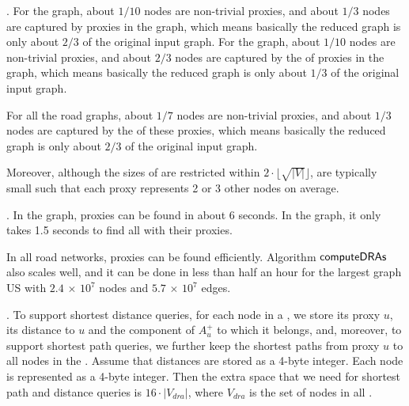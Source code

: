.
For the \dblp graph, about $1/10$ nodes are non-trivial proxies, and about $1/3$ nodes are captured by proxies in the graph, which means basically the reduced graph is only about $2/3$ of the original input graph. For the \dblpone graph, about $1/10$ nodes are non-trivial proxies, and about $2/3$ nodes are captured by the \dras of proxies in the graph, which means basically the reduced graph is only about $1/3$ of the original input graph.

For all the road graphs,  about $1/7$ nodes are non-trivial proxies, and about $1/3$ nodes are captured by the \dras of these proxies, which means basically the reduced graph is only about $2/3$ of the original input graph.

 Moreover, although the sizes of \dras are restricted within $2\cdot\lfloor\sqrt{|V|}\rfloor$, \dras are typically small such that each proxy represents 2 or 3 other nodes on average.







.
In the \dblp graph, proxies can be found in about 6 seconds. In the \dblpone graph, it only takes 1.5 seconds to find all \dras with their proxies.

In all road networks, proxies can be found efficiently. Algorithm ${\mathsf{computeDRAs}}$ also scales well, and it can be done in less than half an hour for the largest graph US with $2.4$ $\times$ $10^7$ nodes and $5.7$ $\times$ $10^7$ edges.

.
To support shortest distance queries, for each node in a \dra, we store its proxy $u$, its distance to $u$ and the component of $A^{+}_u$ to which it belongs, and, moreover, to support shortest path queries, we further keep the shortest paths from proxy $u$ to all nodes in the \dra. Assume that distances are stored as a 4-byte integer. Each node is represented as a 4-byte integer. Then the extra space that we need for shortest path and distance queries is $16\cdot |V_{dra}|$, where $V_{dra}$ is the set of nodes in all \dras.

